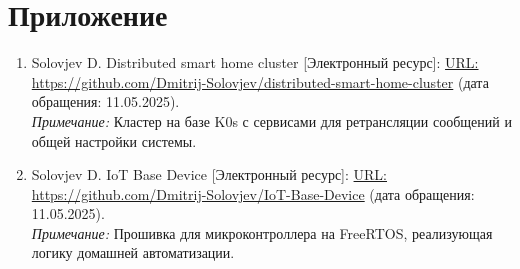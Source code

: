 \documentclass[14pt, a4paper]{extreport}
\begin{document}
\chapter{Приложение}

\begin{enumerate}[label=\arabic*.]
  \item Solovjev D. Distributed smart home cluster  [Электронный ресурс]: 
        \url{URL: https://github.com/Dmitrij-Solovjev/distributed-smart-home-cluster}
        (дата обращения: 11.05.2025). \\
        \emph{Примечание:} Кластер на базе K0s с сервисами для ретрансляции сообщений и общей настройки системы.
        
  \item Solovjev D. IoT Base Device [Электронный ресурс]: 
        \url{URL: https://github.com/Dmitrij-Solovjev/IoT-Base-Device} 
        (дата обращения: 11.05.2025). \\
        \emph{Примечание:} Прошивка для микроконтроллера на FreeRTOS, реализующая логику домашней автоматизации.
\end{enumerate}
\end{document}

